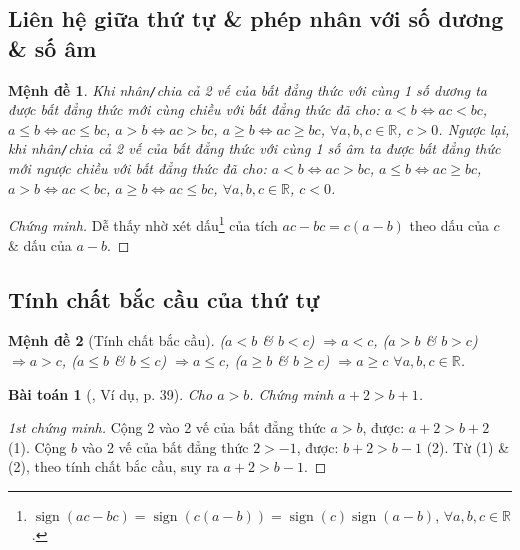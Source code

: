 \documentclass{article}
\newtheorem{baitoan}{Bài toán}
\newtheorem{menhde}{Mệnh đề}
\begin{document}
\subsection{Liên hệ giữa thứ tự \& phép nhân với số dương \& số âm}

\begin{menhde}
	Khi nhân\emph{\texttt{/}}chia cả 2 vế của bất đẳng thức với cùng 1 số dương ta được bất đẳng thức mới cùng chiều với bất đẳng thức đã cho: $a < b\Leftrightarrow ac < bc$, $a\le b\Leftrightarrow ac\le bc$, $a > b\Leftrightarrow ac > bc$, $a\ge b\Leftrightarrow ac\ge bc$, $\forall a,b,c\in\mathbb{R}$, $c > 0$. Ngược lại, khi nhân\emph{\texttt{/}}chia cả 2 vế của bất đẳng thức với cùng 1 số âm ta được bất đẳng thức mới ngược chiều với bất đẳng thức đã cho: $a < b\Leftrightarrow ac > bc$, $a\le b\Leftrightarrow ac\ge bc$, $a > b\Leftrightarrow ac < bc$, $a\ge b\Leftrightarrow ac\le bc$, $\forall a,b,c\in\mathbb{R}$, $c < 0$.
\end{menhde}

\begin{proof}[Chứng minh]
	Dễ thấy nhờ xét dấu\footnote{$\operatorname{sign}(ac - bc) = \operatorname{sign}(c(a - b)) = \operatorname{sign}(c)\operatorname{sign}(a - b)$, $\forall a,b,c\in\mathbb{R}$.} của tích $ac - bc = c(a - b)$ theo dấu của $c$ \& dấu của $a - b$. 
\end{proof}

\subsection{Tính chất bắc cầu của thứ tự}

\begin{menhde}[Tính chất bắc cầu]
	($a < b$ \& $b < c$) $\Rightarrow a < c$, ($a > b$ \& $b > c$) $\Rightarrow a > c$, ($a\le b$ \& $b\le c$) $\Rightarrow a\le c$, ($a\ge b$ \& $b\ge c$) $\Rightarrow a\ge c$ $\forall a,b,c\in\mathbb{R}$.
\end{menhde}

\begin{baitoan}[\cite{SGK_Toan_8_tap_2}, Ví dụ, p. 39]
	Cho $a > b$. Chứng minh $a + 2 > b + 1$.
\end{baitoan}

\begin{proof}[1st chứng minh]
	Cộng 2 vào 2 vế của bất đẳng thức $a > b$, được: $a + 2 > b + 2$ (1). Cộng $b$ vào 2 vế của bất đẳng thức $2 > -1$, được: $b + 2 > b - 1$ (2). Từ (1) \& (2), theo tính chất bắc cầu, suy ra $a + 2 > b - 1$.
\end{proof}
\end{document}
